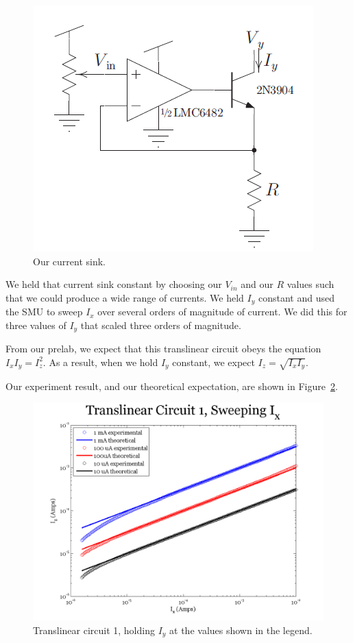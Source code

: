 \documentclass{article}
\begin{document}
\begin{figure}[H]
\begin{center}
\includegraphics[scale=.5]{sink.png}
\caption{Our current sink.}
\label{fig:sink}
\end{center}
\end{figure}

We held that current sink constant by choosing our $V_{in}$ and our $R$ values such that we could produce a wide range of currents.  We held $I_y$ constant and used the SMU to sweep $I_x$ over several orders of magnitude of current.   We did this for three values of $I_y$ that scaled three orders of magnitude.

From our prelab, we expect that this translinear circuit obeys the equation $I_x I_y = I_z ^2$.  As a result, when we hold $I_y$ constant, we expect $I_z = \sqrt{I_xI_y}$.  

Our experiment result, and our theoretical expectation, are shown in Figure~\ref{fig:exp2sweepx}.

\begin{figure}[H]
\begin{center}
\includegraphics[scale=.75]{exp2_sweepx.png}
\caption{Translinear circuit 1, holding $I_y$ at the values shown in the legend.}
\label{fig:exp2sweepx}
\end{center}
\end{figure}
\end{document}
